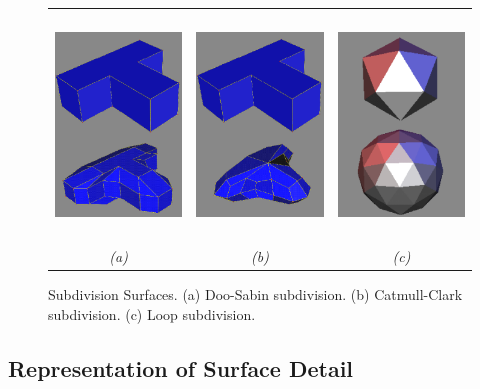 \documentclass[10pt,oneside,fleqn,a4paper]{book}
\begin{document}
\begin{figure}
\begin{center}
\begin{tabular}{ccc}
\includegraphics[height=6cm]{../images/doo-sabin} &
\includegraphics[height=6cm]{../images/catmull-clark} &
\includegraphics[height=6cm]{../images/loop} \\
{\it(a)} & {\it(b)} & {\it(c)}
\end{tabular}
\caption[Subdivision Surfaces]{\label{fig:subdivision} Subdivision Surfaces. (a) Doo-Sabin subdivision. (b) Catmull-Clark subdivision. (c) Loop subdivision.}
\end{center}
\end{figure}

\subsection{\label{sec:reviewdetail}Representation of Surface Detail}
\end{document}
